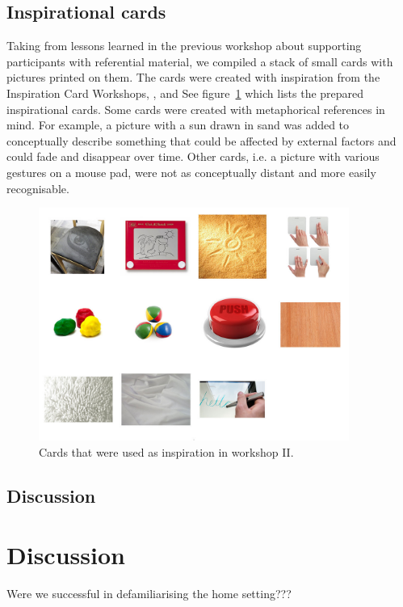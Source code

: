\subsection{Inspirational cards}

Taking from lessons learned in the previous workshop about supporting participants with referential material, we compiled a stack of small cards with pictures printed on them.
The cards were created with inspiration from the Inspiration Card Workshops, \cite{halskov2006inspiration}, and \todo{\dots}
See figure~\ref{ch:workshops:technology-cards} which lists the prepared inspirational cards.
Some cards were created with metaphorical references in mind.
For example, a picture with a sun drawn in sand was added to conceptually describe something that could be affected by external factors and could fade and disappear over time.
Other cards, i.e. a picture with various gestures on a mouse pad, were not as conceptually distant and more easily recognisable.

\begin{figure}[hb]
  \centering
    \includegraphics[width=4in]{workshops/technology-cards}
    \caption[A list of inspirational workshop cards.] %
  {Cards that were used as inspiration in workshop II.} %
  \label{ch:workshops:technology-cards}
\end{figure}



\subsection{Discussion}


\section{Discussion}

 Were we successful in defamiliarising the home setting???

